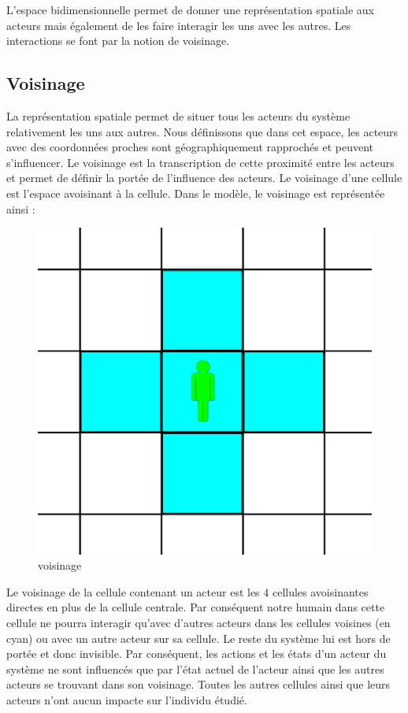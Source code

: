 L'espace bidimensionnelle permet de donner une représentation spatiale aux acteurs mais également de les faire interagir les uns avec les autres. Les interactions se font par la notion de voisinage. 

\newpage

\subsection{Voisinage}

La représentation spatiale permet de situer tous les acteurs du système relativement les uns aux autres. Nous définissons que dans cet espace, les acteurs avec des coordonnées proches sont géographiquement rapprochés et peuvent s'influencer. Le voisinage est la transcription de cette proximité entre les acteurs et permet de définir la portée de l'influence des acteurs. Le voisinage d'une cellule est l'espace avoisinant à la cellule. Dans le modèle, le voisinage est représentée ainsi :\\

\begin{figure}[h]
\centering
\captionsetup{justification=centering}
\includegraphics[scale=0.5]{Images/voisinage.png}
\caption{voisinage}
\end{figure}

Le voisinage de la cellule contenant un acteur est les $4$ cellules avoisinantes directes en plus de la cellule centrale. Par conséquent notre humain dans cette cellule ne pourra interagir qu'avec d'autres acteurs dans les cellules voisines (en cyan) ou avec un autre acteur sur sa cellule. Le reste du système lui est hors de portée et donc invisible. Par conséquent, les actions et les états d'un acteur du système ne sont influencés que par l'état actuel de l'acteur ainsi que les autres acteurs se trouvant dans son voisinage. Toutes les autres cellules ainsi que leurs acteurs n'ont aucun impacte sur l'individu étudié.


